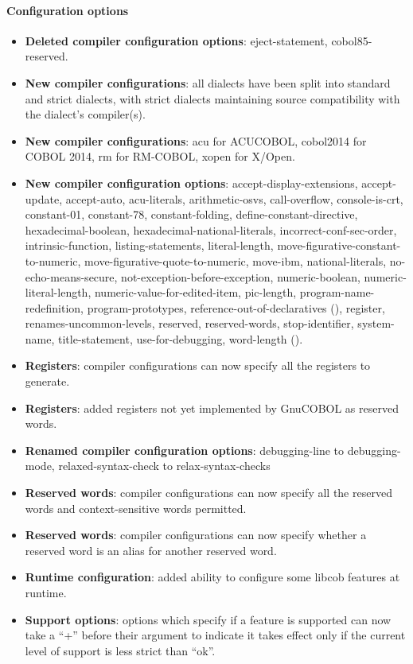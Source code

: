 \paragraph{Configuration options}
\begin{itemize}
\item \textbf{Deleted compiler configuration options}: eject-statement, cobol85-reserved.
\item \textbf{New compiler configurations}: all dialects have been split into standard and strict dialects, with strict dialects maintaining source compatibility with the dialect's compiler(s).
\item \textbf{New compiler configurations}: acu for ACUCOBOL, cobol2014 for COBOL 2014, rm for RM-COBOL, xopen for X\slash{}Open.
\item \textbf{New compiler configuration options}: accept-display-extensions, accept-update, accept-auto, acu-literals, arithmetic-osvs, call-overflow, console-is-crt, constant-01, constant-78, constant-folding, define-constant-directive, hexadecimal-boolean, hexadecimal-national-literals, incorrect-conf-sec-order, intrinsic-function, listing-statements, literal-length, move-figurative-constant-to-numeric, move-figurative-quote-to-numeric, move-ibm, national-literals, no-echo-means-secure, not-exception-before-exception, numeric-boolean, numeric-literal-length, numeric-value-for-edited-item, pic-length, program-name-redefinition, program-prototypes, reference-out-of-declaratives (), register, renames-uncommon-levels, reserved, reserved-words, stop-identifier, system-name, title-statement, use-for-debugging, word-length (). %
\item \textbf{Registers}: compiler configurations can now specify all the registers to generate.
\item \textbf{Registers}: added registers not yet implemented by GnuCOBOL as reserved words.
\item \textbf{Renamed compiler configuration options}: debugging-line to debugging-mode, relaxed-syntax-check to relax-syntax-checks
\item \textbf{Reserved words}: compiler configurations can now specify all the reserved words and context-sensitive words permitted.
\item \textbf{Reserved words}: compiler configurations can now specify whether a reserved word is an alias for another reserved word. %
\item \textbf{Runtime configuration}: added ability to configure some libcob features at runtime.
\item \textbf{Support options}: options which specify if a feature is supported can now take a ``+'' before their argument to indicate it takes effect only if the current level of support is less strict than ``ok''.
\end{itemize}

